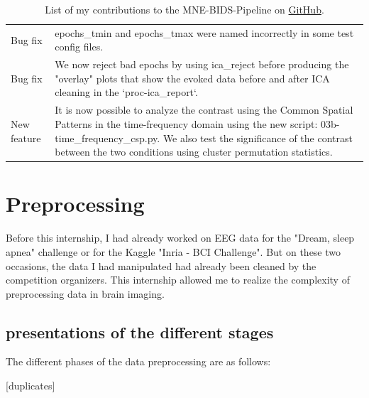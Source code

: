 \begin{table}[ht]
\begin{tabular}{@{}| p{3cm}|p{9cm}| @{}}
        Bug fix          & epochs\_tmin and epochs\_tmax were named incorrectly in some test config files.                                                                                                                                                                                             \\
        Bug fix          & We now reject bad epochs by using ica\_reject before producing the "overlay" plots that show the evoked data before and after ICA cleaning in the `proc-ica\_report`.                                                                                                       \\
        New feature      & It is now possible to analyze the contrast using the Common Spatial Patterns in the time-frequency domain using the new script: 03b-time\_frequency\_csp.py. We also test the significance of the contrast between the two conditions using cluster permutation statistics. \\
        \hline
    \end{tabular}

    \caption[List of my contributions to the MNE-BIDS-Pipeline.]%
    {List of my contributions to the MNE-BIDS-Pipeline on \href{https://raw.githubusercontent.com/mne-tools/mne-bids-pipeline/main/docs/source/changes.md}{GitHub}.}
    \label{Tab:PR}
\end{table}

\section{Preprocessing}

Before this internship, I had already worked on EEG data for the "Dream, sleep apnea" challenge or for the Kaggle "Inria - BCI Challenge". But on these two occasions, the data I had manipulated had already been cleaned by the competition organizers. This internship allowed me to realize the complexity of preprocessing data in brain imaging.

\subsection{presentations of the different stages}

The different phases of the data preprocessing are as follows:

[duplicates]


